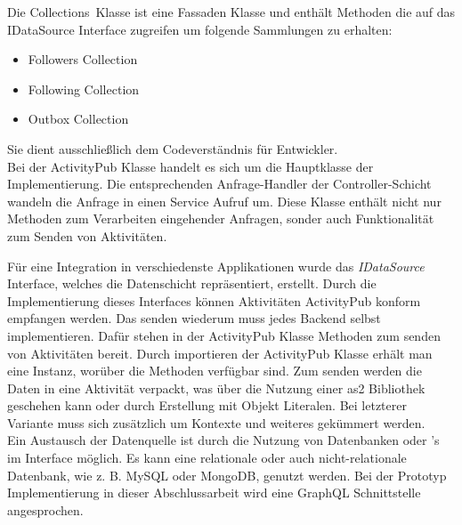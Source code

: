 Die \glqq Collections\grqq~Klasse ist eine Fassaden Klasse und enthält Methoden die auf das IDataSource Interface zugreifen um folgende Sammlungen zu erhalten:
\begin{itemize}
	\item Followers Collection
	\item Following Collection
	\item Outbox Collection
\end{itemize} 
Sie dient ausschließlich dem Codeverständnis für Entwickler.\\

Bei der ActivityPub Klasse handelt es sich um die Hauptklasse der Implementierung. Die entsprechenden Anfrage-Handler der Controller-Schicht wandeln die Anfrage in einen Service Aufruf um. Diese Klasse enthält nicht nur Methoden zum Verarbeiten eingehender Anfragen, sonder auch Funktionalität zum Senden von Aktivitäten.

Für eine Integration in verschiedenste Applikationen wurde das \textit{IDataSource} Interface, welches die Datenschicht repräsentiert, erstellt. Durch die Implementierung dieses Interfaces können Aktivitäten ActivityPub konform empfangen werden. Das senden wiederum muss jedes Backend selbst implementieren. Dafür stehen in der ActivityPub Klasse Methoden zum senden von Aktivitäten bereit. Durch importieren der ActivityPub Klasse erhält man eine Instanz, worüber die Methoden verfügbar sind. Zum senden werden die Daten in eine Aktivität verpackt, was über die Nutzung einer \gls{as2} Bibliothek geschehen kann oder durch Erstellung mit Objekt Literalen. Bei letzterer Variante muss sich zusätzlich um Kontexte und weiteres gekümmert werden.\\

Ein Austausch der Datenquelle ist durch die Nutzung von Datenbanken oder 's im Interface möglich. Es kann eine relationale oder auch nicht-relationale Datenbank, wie z. B. MySQL oder MongoDB, genutzt werden. Bei der Prototyp Implementierung in dieser Abschlussarbeit wird eine GraphQL Schnittstelle angesprochen.\\

